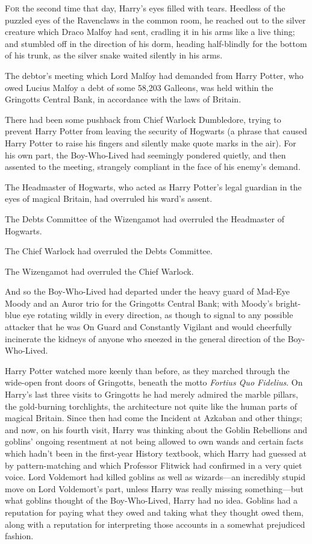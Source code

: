 

\lettrine{F}{or} the second
time that day, Harry's eyes filled with tears. Heedless of the puzzled eyes of
the Ravenclaws in the common room, he reached out to the silver creature which
Draco Malfoy had sent, cradling it in his arms like a live thing; and stumbled
off in the direction of his dorm, heading half-blindly for the bottom of
his trunk, as the silver snake waited silently in his arms.

The debtor's meeting which Lord Malfoy had demanded from Harry Potter, who owed
Lucius Malfoy a debt of some 58,203 Galleons, was held within the Gringotts
Central Bank, in accordance with the laws of Britain.

There had been some pushback from Chief Warlock Dumbledore, trying to prevent
Harry Potter from leaving the security of Hogwarts (a phrase that caused Harry
Potter to raise his fingers and silently make quote marks in the air). For his
own part, the Boy-Who-Lived had seemingly pondered quietly, and then assented
to the meeting, strangely compliant in the face of his enemy's demand.

The Headmaster of Hogwarts, who acted as Harry Potter's legal guardian in the
eyes of magical Britain, had overruled his ward's assent.

The Debts Committee of the Wizengamot had overruled the Headmaster of Hogwarts.

The Chief Warlock had overruled the Debts Committee.

The Wizengamot had overruled the Chief Warlock.

And so the Boy-Who-Lived had departed under the heavy guard of Mad-Eye Moody
and an Auror trio for the Gringotts Central Bank; with Moody's bright-blue eye
rotating wildly in every direction, as though to signal to any possible
attacker that he was On Guard and Constantly Vigilant and would cheerfully
incinerate the kidneys of anyone who sneezed in the general direction of the
Boy-Who-Lived.

Harry Potter watched more keenly than before, as they marched through the
wide-open front doors of Gringotts, beneath the motto \emph{Fortius Quo
Fidelius}. On Harry's last three visits to Gringotts he had merely admired the
marble pillars, the gold-burning torchlights, the architecture not quite like
the human parts of magical Britain. Since then had come the Incident at Azkaban
and other things; and now, on his fourth visit, Harry was thinking about the
Goblin Rebellions and goblins' ongoing resentment at not being allowed to own
wands and certain facts which hadn't been in the first-year History textbook,
which Harry had guessed at by pattern-matching and which Professor Flitwick had
confirmed in a very quiet voice. Lord Voldemort had killed goblins as well as
wizards---an incredibly stupid move on Lord Voldemort's part, unless Harry was
really missing something---but what goblins thought of the Boy-Who-Lived, Harry
had no idea. Goblins had a reputation for paying what they owed and taking what
they thought owed them, along with a reputation for interpreting those accounts
in a somewhat prejudiced fashion.

